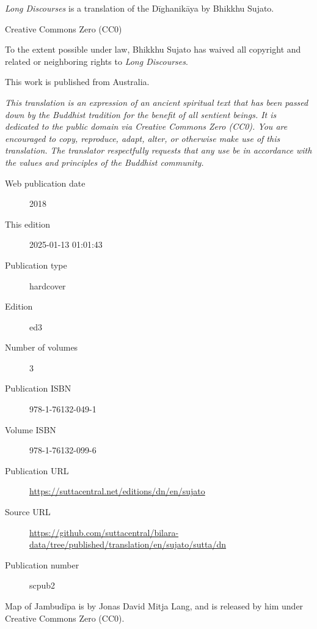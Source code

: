 \documentclass[12pt,openany]{book}%
\begin{document}
\begin{footnotesize}

\textit{Long Discourses} is a translation of the Dīghanikāya by Bhikkhu Sujato.

\medskip

Creative Commons Zero (CC0)

To the extent possible under law, Bhikkhu Sujato has waived all copyright and related or neighboring rights to \textit{Long Discourses}.

\medskip

This work is published from Australia.

\begin{center}
\textit{This translation is an expression of an ancient spiritual text that has been passed down by the Buddhist tradition for the benefit of all sentient beings. It is dedicated to the public domain via Creative Commons Zero (CC0). You are encouraged to copy, reproduce, adapt, alter, or otherwise make use of this translation. The translator respectfully requests that any use be in accordance with the values and principles of the Buddhist community.}
\end{center}

\medskip

\begin{description}
    \item[Web publication date] 2018
    \item[This edition] 2025-01-13 01:01:43
    \item[Publication type] hardcover
    \item[Edition] ed3
    \item[Number of volumes] 3
    \item[Publication ISBN] 978-1-76132-049-1
    \item[Volume ISBN] 978-1-76132-099-6
    \item[Publication URL] \href{https://suttacentral.net/editions/dn/en/sujato}{https://suttacentral.net/editions/dn/en/sujato}
    \item[Source URL] \href{https://github.com/suttacentral/bilara-data/tree/published/translation/en/sujato/sutta/dn}{https://github.com/suttacentral/bilara-data/tree/published/translation/en/sujato/sutta/dn}
    \item[Publication number] scpub2
\end{description}

\medskip

Map of Jambudīpa is by Jonas David Mitja Lang, and is released by him under Creative Commons Zero (CC0).


\end{footnotesize}
\end{document}
